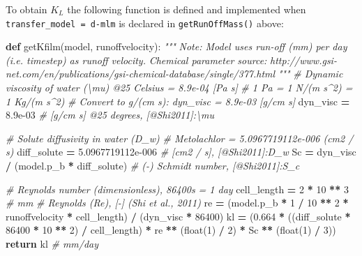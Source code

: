 \documentclass[]{article}
\newenvironment{Shaded}{\begin{snugshade}}{\end{snugshade}}
\newcommand{\KeywordTok}[1]{\textcolor[rgb]{0.13,0.29,0.53}{\textbf{{#1}}}}
\newcommand{\DecValTok}[1]{\textcolor[rgb]{0.00,0.00,0.81}{{#1}}}
\newcommand{\FloatTok}[1]{\textcolor[rgb]{0.00,0.00,0.81}{{#1}}}
\newcommand{\CommentTok}[1]{\textcolor[rgb]{0.56,0.35,0.01}{\textit{{#1}}}}
\newcommand{\ControlFlowTok}[1]{\textcolor[rgb]{0.13,0.29,0.53}{\textbf{{#1}}}}
\newcommand{\OperatorTok}[1]{\textcolor[rgb]{0.81,0.36,0.00}{\textbf{{#1}}}}
\newcommand{\BuiltInTok}[1]{{#1}}
\newcommand{\NormalTok}[1]{{#1}}
\begin{document}
To obtain \(K_L\) the following function is defined and implemented when
\texttt{transfer\_model\ =\ \textquotesingle{}d-mlm\textquotesingle{}}
is declared in \texttt{getRunOffMass()} above:

\begin{Shaded}
\begin{Highlighting}[]
\KeywordTok{def} \NormalTok{getKfilm(model, runoffvelocity):}
    \CommentTok{"""}
\CommentTok{    Note: Model uses run-off (mm) per day (i.e. timestep) as runoff velocity.}
\CommentTok{    Chemical parameter source:}
\CommentTok{    http://www.gsi-net.com/en/publications/gsi-chemical-database/single/377.html}
\CommentTok{    """}
    \CommentTok{# Dynamic viscosity of water (\textbackslash{}mu) @25 Celsius = 8.9e-04 [Pa s]}
    \CommentTok{#   1 Pa = 1 N/(m s^2) = 1 Kg/(m s^2)}
    \CommentTok{#   Convert to g/(cm s): dyn_visc = 8.9e-03 [g/cm s]}
    \NormalTok{dyn_visc }\OperatorTok{=} \FloatTok{8.9e-03}  \CommentTok{# [g/cm s] @25 degrees, [@Shi2011]:\textbackslash{}mu}

    \CommentTok{# Solute diffusivity in water (D_w)}
    \CommentTok{# Metolachlor = 5.0967719112e-006 (cm2 / s)}
    \NormalTok{diff_solute }\OperatorTok{=} \FloatTok{5.0967719112e-006}  \CommentTok{# [cm2 / s], [@Shi2011]:D_w}
    \NormalTok{Sc }\OperatorTok{=} \NormalTok{dyn_visc }\OperatorTok{/} \NormalTok{(model.p_b }\OperatorTok{*} \NormalTok{diff_solute)  }\CommentTok{# (-) Schmidt number, [@Shi2011]:S_c}

    \CommentTok{# Reynolds number (dimensionless), 86400s = 1 day}
    \NormalTok{cell_length }\OperatorTok{=} \DecValTok{2} \OperatorTok{*} \DecValTok{10} \OperatorTok{**} \DecValTok{3}  \CommentTok{# mm}
    \CommentTok{# Reynolds (Re), [-] (Shi et al., 2011)}
    \NormalTok{re }\OperatorTok{=} \NormalTok{(model.p_b }\OperatorTok{*} \DecValTok{1} \OperatorTok{/} \DecValTok{10} \OperatorTok{**} \DecValTok{2} \OperatorTok{*} \NormalTok{runoffvelocity }\OperatorTok{*} \NormalTok{cell_length) }\OperatorTok{/} \NormalTok{(dyn_visc }\OperatorTok{*} \DecValTok{86400}\NormalTok{)}
    \NormalTok{kl }\OperatorTok{=} \NormalTok{(}\FloatTok{0.664} \OperatorTok{*} \NormalTok{((diff_solute }\OperatorTok{*} \DecValTok{86400} \OperatorTok{*} \DecValTok{10} \OperatorTok{**} \DecValTok{2}\NormalTok{) }\OperatorTok{/} \NormalTok{cell_length) }\OperatorTok{*}
          \NormalTok{re }\OperatorTok{**} \NormalTok{(}\BuiltInTok{float}\NormalTok{(}\DecValTok{1}\NormalTok{) }\OperatorTok{/} \DecValTok{2}\NormalTok{) }\OperatorTok{*} \NormalTok{Sc }\OperatorTok{**} \NormalTok{(}\BuiltInTok{float}\NormalTok{(}\DecValTok{1}\NormalTok{) }\OperatorTok{/} \DecValTok{3}\NormalTok{)) }
    \ControlFlowTok{return} \NormalTok{kl  }\CommentTok{# mm/day}
\end{Highlighting}
\end{Shaded}
\end{document}

